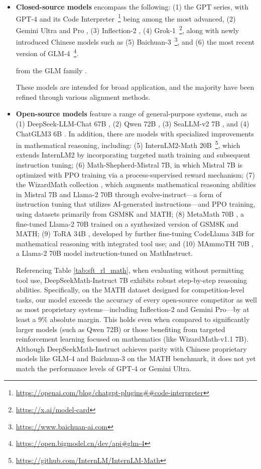 \begin{itemize}[topsep=0pt]
\begin{itemize}[topsep=0pt]
    \item \textbf{Closed-source models} encompass the following: (1) the GPT series, with GPT-4 \citep{gpt4} and its Code Interpreter~\footnote{\url{https://openai.com/blog/chatgpt-plugins\#\#code-interpreter}} being among the most advanced, (2) Gemini Ultra and Pro \citep{gemini}, (3) Inflection-2 \citep{inflection-2}, (4) Grok-1~\footnote{\url{https://x.ai/model-card}},
    along with newly introduced Chinese models such as (5) Baichuan-3~\footnote{\url{https://www.baichuan-ai.com}},
    and (6) the most recent version of GLM-4~\footnote{\url{https://open.bigmodel.cn/dev/api\#glm-4}}.

    from the GLM family \citep{glm}.

These models are intended for broad application, and the majority have been refined through various alignment methods.

\item \textbf{Open-source models} feature a range of general-purpose systems, such as (1) DeepSeek-LLM-Chat 67B \citep{deepseek-llm}, (2) Qwen 72B \citep{qwen}, (3) SeaLLM-v2 7B \citep{seallm}, and (4) ChatGLM3 6B \citep{chatglm3}. In addition, there are models with specialized improvements in mathematical reasoning, including: (5) InternLM2-Math 20B~\footnote{\url{https://github.com/InternLM/InternLM-Math}}, which extends InternLM2 by incorporating targeted math training and subsequent instruction tuning; (6) Math-Shepherd-Mistral 7B, in which Mistral 7B \citep{mistral} is optimized with PPO training \citep{schulman2017proximal} via a process-supervised reward mechanism; (7) the WizardMath collection \citep{wizardmath}, which augments mathematical reasoning abilities in Mistral 7B and Llama-2 70B \citep{llama2} through evolve-instruct—a form of instruction tuning that utilizes AI-generated instructions—and PPO training, using datasets primarily from GSM8K and MATH; (8) MetaMath 70B \citep{metamath}, a fine-tuned Llama-2 70B trained on a synthesized version of GSM8K and MATH; (9) ToRA 34B \cite{tora}, developed by further fine-tuning CodeLlama 34B for mathematical reasoning with integrated tool use; and (10) MAmmoTH 70B \citep{MathInstruct}, a Llama-2 70B model instruction-tuned on MathInstruct.

Referencing Table \ref{tab:sft_rl_math}, when evaluating without permitting tool use, DeepSeekMath-Instruct 7B exhibits robust step-by-step reasoning abilities. Specifically, on the MATH dataset designed for competition-level tasks, our model exceeds the accuracy of every open-source competitor as well as most proprietary systems—including Inflection-2 and Gemini Pro—by at least a 9\% absolute margin. This holds even when compared to significantly larger models (such as Qwen 72B) or those benefiting from targeted reinforcement learning focused on mathematics (like WizardMath-v1.1 7B). Although DeepSeekMath-Instruct achieves parity with Chinese proprietary models like GLM-4 and Baichuan-3 on the MATH benchmark, it does not yet match the performance levels of GPT-4 or Gemini Ultra.


\end{itemize}
\end{itemize}
